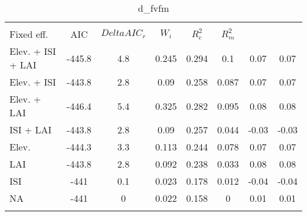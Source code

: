 
\begin{table}[!htbp] \centering 
  \caption{d_fvfm} 
  \label{d_fvfm} 
\begin{tabular}{@{\extracolsep{5pt}} lS[table-format=3.2]S[table-format=3.2]S[table-format=3.2]S[table-format=3.2]S[table-format=3.2]S[table-format=3.2]S[table-format=3.2]} 
\\[-1.8ex]\hline 
\hline \\[-1.8ex] 
{Fixed eff.} & {AIC} & {$Delta{}AIC_r$} & {$W_i$} & {$R^2_c$} & {$R^2_m$} %
\hline \\[-1.8ex] 
Elev. + ISI + LAI & -445.8 & 4.8 & 0.245 & 0.294 & 0.1 & 0.07 & 0.07 \\ 
Elev. + ISI & -443.8 & 2.8 & 0.09 & 0.258 & 0.087 & 0.07 & 0.07 \\ 
Elev. + LAI & -446.4 & 5.4 & 0.325 & 0.282 & 0.095 & 0.08 & 0.08 \\ 
ISI + LAI & -443.8 & 2.8 & 0.09 & 0.257 & 0.044 & -0.03 & -0.03 \\ 
Elev. & -444.3 & 3.3 & 0.113 & 0.244 & 0.078 & 0.07 & 0.07 \\ 
LAI & -443.8 & 2.8 & 0.092 & 0.238 & 0.033 & 0.08 & 0.08 \\ 
ISI & -441 & 0.1 & 0.023 & 0.178 & 0.012 & -0.04 & -0.04 \\ 
NA & -441 & 0 & 0.022 & 0.158 & 0 & 0.01 & 0.01 \\ 
\hline \\[-1.8ex] 
\end{tabular} 
\end{table} 
